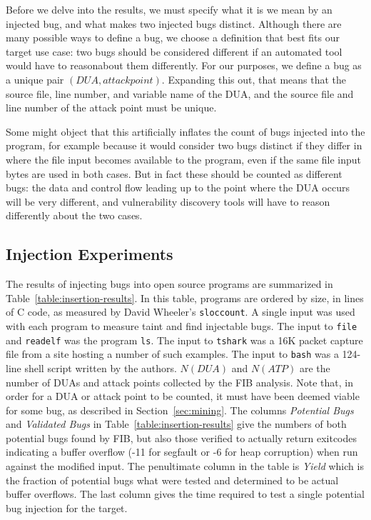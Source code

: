 Before we delve into the results, we must specify what it is we mean by an injected bug, and what makes two injected bugs distinct. Although there are many possible ways to define a bug, we choose a definition that best fits our target use case: two bugs should be considered different if an automated tool would have to reasonabout them differently. For our purposes, we define a bug as a unique pair $(DUA, attack point)$. Expanding this out, that means that the source file, line number, and variable name of the DUA, and the source file and line number of the attack point must be unique.

Some might object that this artificially inflates the count of bugs injected into the program, for example because it would consider two bugs distinct if they differ in where the file input becomes available to the program, even if the same file input bytes are used in both cases. But in fact these should be counted as different bugs: the data and control flow leading up to the point where the DUA occurs will be very different, and vulnerability discovery tools will have to reason differently about the two cases.

\subsection{Injection Experiments}
\label{sec:results:subsec:injection}

The results of injecting bugs into open source programs are summarized in Table~\ref{table:insertion-results}.
In this table, programs are ordered by size, in lines of C code, as measured by David Wheeler's \verb+sloccount+.
A single input was used with each program to measure taint and find injectable bugs.
The input to \verb+file+ and \verb+readelf+ was the program \verb+ls+.
The input to \verb+tshark+ was a 16K packet capture file from a site hosting a number of such examples.  %
The input to \verb+bash+ was a 124-line shell script written by the authors.
$N(DUA)$ and $N(ATP)$ are the number of DUAs and attack points collected by the FIB analysis.
Note that, in order for a DUA or attack point to be counted, it must have been deemed viable for some bug, as described in Section~\ref{sec:mining}.
The columns \emph{Potential Bugs} and \emph{Validated Bugs} in Table~\ref{table:insertion-results} give the numbers of both potential bugs found by FIB, but also those verified to actually return exitcodes indicating a buffer overflow (-11 for segfault or -6 for heap corruption) when run against the modified input.
The penultimate column in the table is \emph{Yield} which is the fraction of potential bugs what were tested and determined to be actual buffer overflows.
The last column gives the time required to test a single potential bug injection for the target.


